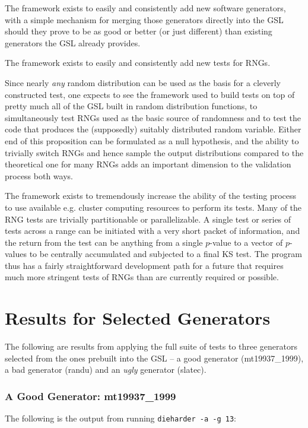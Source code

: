 \documentclass[12pt]{book}
\begin{document}
The framework exists to easily and consistently add new software
generators, with a simple mechanism for merging those generators
directly into the GSL should they prove to be as good or better (or just
different) than existing generators the GSL already provides.

The framework exists to easily and consistently add new tests for RNGs.

Since nearly {\em any} random distribution can be used as the basis for
a cleverly constructed test, one expects to see the framework used to
build tests on top of pretty much all of the GSL built in random
distribution functions, to simultaneously test RNGs used as the basic
source of randomness and to test the code that produces the (supposedly)
suitably distributed random variable.  Either end of this proposition
can be formulated as a null hypothesis, and the ability to trivially
switch RNGs and hence sample the output distributions compared to the
theoretical one for many RNGs adds an important dimension to the
validation process both ways.

The framework exists to tremendously increase the ability of the testing
process to use available e.g. cluster computing resources to perform its
tests.  Many of the RNG tests are trivially partitionable or
parallelizable.  A single test or series of tests across a range can be
initiated with a very short packet of information, and the return from
the test can be anything from a single $p$-value to a vector of
$p$-values to be centrally accumulated and subjected to a final KS test.
The program thus has a fairly straightforward development path for a
future that requires much more stringent tests of RNGs than are
currently required or possible.

\chapter{Results for Selected Generators}

The following are results from applying the full suite of tests to three
generators selected from the ones prebuilt into the GSL -- a good
generator (mt19937\_1999), a bad generator (randu) and an {\em ugly}
generator (slatec).

\subsection{A Good Generator: mt19937\_1999}

The following is the output from running {\tt dieharder -a -g 13}:
\end{document}
